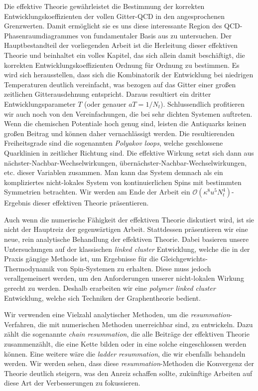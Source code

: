 {Die effektive Theorie gewährleistet die Bestimmung der korrekten
Entwicklungskoeffizienten der vollen Gitter-QCD in den angesprochenen
Grenzwerten. Damit ermöglicht sie es uns diese interessante Region des
QCD-Phasenraumdiagrammes von fundamentaler Basis aus zu untersuchen. Der
Hauptbestandteil der vorliegenden Arbeit ist die Herleitung dieser effektiven
Theorie und beinhaltet ein volles Kapitel, das sich allein damit beschäftigt,
die korrekten Entwicklungskoeffizienten Ordnung für Ordnung zu bestimmen. Es
wird sich herausstellen, dass sich die Kombinatorik der Entwicklung bei
niedrigen Temperaturen deutlich vereinfacht, was bezogen auf das Gitter einer
großen zeitlichen Gitterausdehnung entspricht. Daraus resultiert ein dritter
Entwicklungsparameter $T$ (oder genauer  $a T = 1/N_t$). Schlussendlich
profitieren wir auch noch von den Vereinfachungen, die bei sehr dichten Systemen
auftreten. Wenn die chemischen Potentiale hoch genug sind, leisten die
Antiquarks keinen großen Beitrag und können daher vernachlässigt werden. Die
resultierenden Freiheitsgrade sind die sogenannten  \emph{Polyakov  loops},
welche geschlossene Quarklinien in zeitlicher Richtung sind. Die effektive
Wirkung setzt sich dann aus nächster-Nachbar-Wechselwirkungen,
übernächster-Nachbar-Wechselwirkungen, etc. dieser Variablen zusammen. Man kann
das System demnach als ein kompliziertes nicht-lokales System von
kontinuierlichen Spins mit bestimmten Symmetrien betrachten. Wir werden am Ende
der Arbeit ein $\mathcal{O}(\kappa^8 u^5 N_t^4)$-Ergeb\-nis dieser effektiven
Theorie präsentieren.

Auch wenn die numerische Fähigkeit der effektiven Theorie diskutiert wird, ist
sie nicht der Hauptreiz der gegenwärtigen Arbeit. Stattdessen präsentieren wir
eine neue, rein analytische Behandlung der effektiven Theorie. Dabei basieren
unsere Untersuchungen auf der klassischen \emph{linked cluster} Entwicklung,
welche die in der Praxis gängige Methode ist, um Ergebnisse für die
Gleichgewichts-Thermodynamik von Spin-Systemen zu erhalten. Diese muss jedoch
verallgemeinert werden, um den Anforderungen unserer nicht-lokalen Wirkung
gerecht zu werden. Deshalb erarbeiten wir eine \emph{polymer linked cluster}
Entwicklung, welche sich Techniken der Graphentheorie bedient.

Wir verwenden eine Vielzahl analytischer Methoden, um die
\emph{resummation}-Verfahren, die mit numerischen Methoden unerreichbar sind, zu
entwickeln. Dazu zählt die sogenannte \emph{chain resummation}, die alle
Beiträge der effektiven Theorie zusammenzählt, die eine Kette bilden oder in
eine solche eingeschlossen werden können. Eine weitere wäre die \emph{ladder
  resummation}, die wir ebenfalls behandeln werden. Wir werden sehen, dass diese
\emph{resummation}-Methoden die Konvergenz der Theorie deutlich steigern, was
den Anreiz schaffen sollte, zukünftige Arbeiten auf diese Art der Verbesserungen
zu fokussieren.

}
